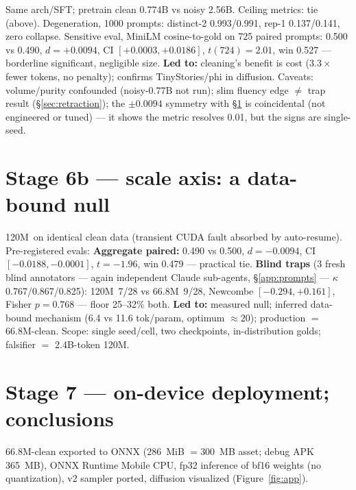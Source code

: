 \documentclass[11pt]{article}
\newcommand{\sixsix}{66.8M}
\newcommand{\onetwenty}{120M}
\begin{document}
Same arch/SFT; pretrain clean 0.774B vs noisy 2.56B. Ceiling metrics: tie (above). Degeneration, 1000 prompts: distinct-2 0.993/0.991, rep-1 0.137/0.141, zero collapse. Sensitive eval, MiniLM cosine-to-gold on 725 paired prompts: 0.500 vs 0.490, $d=+0.0094$, CI $[+0.0003,+0.0186]$, $t(724)=2.01$, win 0.527 --- borderline significant, negligible size. \textbf{Led to:} cleaning's benefit is cost ($3.3\times$ fewer tokens, no penalty); confirms TinyStories/phi in diffusion. Caveats: volume/purity confounded (noisy-0.77B not run); slim fluency edge $\neq$ trap result (\S\ref{sec:retraction}); the $\pm0.0094$ symmetry with \S\ref{sec:scale} is coincidental (not engineered or tuned) --- it shows the metric resolves 0.01, but the signs are single-seed.

\section{Stage 6b --- scale axis: a data-bound null}\label{sec:scale}

\onetwenty\ on identical clean data (transient CUDA fault absorbed by auto-resume). Pre-registered evals:
\textbf{Aggregate paired:} 0.490 vs 0.500, $d=-0.0094$, CI $[-0.0188,-0.0001]$, $t=-1.96$, win 0.479 --- practical tie. \textbf{Blind traps} (3 fresh blind annotators --- again independent Claude sub-agents, \S\ref{app:prompts} --- $\kappa$ 0.767/0.867/0.825): \onetwenty\ 7/28 vs \sixsix\ 9/28, Newcombe $[-0.294,+0.161]$, Fisher $p=0.768$ --- floor 25--32\% both. \textbf{Led to:} measured null; inferred data-bound mechanism (6.4 vs 11.6 tok/param, optimum ${\approx}20$); production $=$ \sixsix-clean. Scope: single seed/cell, two checkpoints, in-distribution golds; falsifier $=$ 2.4B-token \onetwenty.

\section{Stage 7 --- on-device deployment; conclusions}\label{sec:deploy}

\sixsix-clean exported to ONNX ($286$~MiB $=300$~MB asset; debug APK 365~MB), ONNX Runtime Mobile CPU, fp32 inference of bf16 weights (no quantization), v2 sampler ported, diffusion visualized (Figure~\ref{fig:app}).
\end{document}
